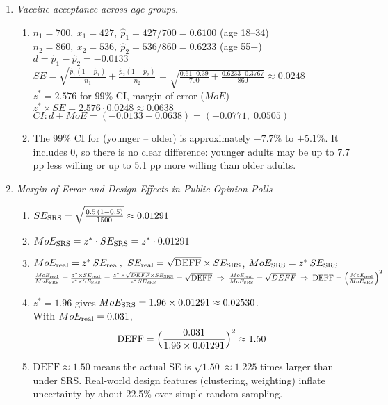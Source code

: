 \documentclass{article}
\begin{document}
\begin{enumerate}
\item \emph{Vaccine acceptance across age groups.}
\begin{enumerate}[label=(\alph*)]
  \item
    $n_1=700,\ x_1=427,\ \hat p_1=427/700=0.6100$ (age 18–34)\\
    $n_2=860,\ x_2=536,\ \hat p_2=536/860=0.6233$ (age 55+)\\
    $d=\hat p_1-\hat p_2=-0.0133$\\
    $SE=\sqrt{\frac{\hat p_1(1-\hat p_1)}{n_1}+\frac{\hat p_2(1-\hat p_2)}{n_2}}
       =\sqrt{\frac{0.61\cdot0.39}{700}+\frac{0.6233\cdot0.3767}{860}}\approx0.0248$\\
    $z^*=2.576$ for 99\% CI, margin of error ($MoE$) $z^* \times SE=2.576\cdot0.0248\approx0.0638$\\
    $\displaystyle CI:d\pm MoE=(-0.0133\pm0.0638)=(-0.0771,\;0.0505)$
  \item
    The 99\% CI for (younger – older) is approximately \(-7.7\%\) to \(+5.1\%\).
    It includes 0, so there is no clear difference: younger adults may be up to 7.7 pp less willing or up to 5.1 pp more willing than older adults.
\end{enumerate}

\item \emph{Margin of Error and Design Effects in Public Opinion Polls}
\begin{enumerate}[label=(\alph*)]
  \item
    $SE_{\rm SRS}=\sqrt{\frac{0.5\,(1-0.5)}{1500}}\approx0.01291$
  \item
    $MoE_{\rm SRS}=z^*\cdot SE_{\rm SRS}=z^*\cdot 0.01291$
  \item
    $MoE_{\rm real}=z^*\,SE_{\rm real},$ \quad $SE_{\rm real}=\sqrt{\mathrm{DEFF}}\times SE_{\rm SRS}$, \quad  $MoE_{\rm SRS}=z^*\,SE_{\rm SRS}$ \\
    $\frac{MoE_{\rm real}}{MoE_{\rm SRS}}
      =\frac{z^*\times SE_{\rm real}}{z^*\times SE_{\rm SRS}}
      =\frac{z^*\,\times \sqrt{DEFF} \times SE_{\rm SRS}}{z^*\,SE_{\rm SRS}}
      =\sqrt{\mathrm{DEFF}}
    \;\Rightarrow\;
\frac{MoE_{\rm real}}{MoE_{\rm SRS}} = \sqrt{DEFF}
    \;\Rightarrow\;
    \mathrm{DEFF}=\Bigl(\frac{MoE_{\rm real}}{{MoE_{\rm SRS}} }\Bigr)^2$
  \item
    $z^*=1.96$ gives
    $MoE_{\rm SRS}=1.96\times0.01291\approx0.02530$.\\
    With $MoE_{\rm real}=0.031$,
    \[
      \mathrm{DEFF}=\Bigl(\frac{0.031}{1.96\times0.01291}\Bigr)^2\approx1.50
    \]
  \item
    $\mathrm{DEFF}\approx1.50$ means the actual SE is $\sqrt{1.50}\approx1.225$ times larger than under SRS.
    Real‐world design features (clustering, weighting) inflate uncertainty by about 22.5\% over simple random sampling.
\end{enumerate}


\end{enumerate}
\end{document}
